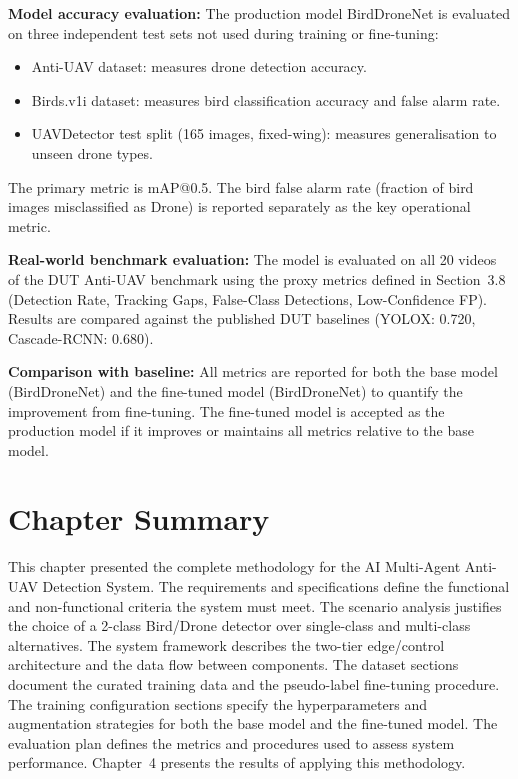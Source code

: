 \documentclass[12pt,a4paper]{report}
\begin{document}
\textbf{Model accuracy evaluation:}
The production model BirdDroneNet is evaluated on three independent
test sets not used during training or fine-tuning:
\begin{itemize}
  \item Anti-UAV dataset: measures drone detection accuracy.
  \item Birds.v1i dataset: measures bird classification
        accuracy and false alarm rate.
  \item UAVDetector test split (165 images, fixed-wing): measures
        generalisation to unseen drone types.
\end{itemize}
The primary metric is mAP@0.5. The bird false alarm rate (fraction of bird
images misclassified as Drone) is reported separately as the key operational
metric.

\textbf{Real-world benchmark evaluation:}
The model is evaluated on all 20 videos of the DUT Anti-UAV benchmark
using the proxy metrics defined in Section~3.8 (Detection Rate, Tracking
Gaps, False-Class Detections, Low-Confidence FP). Results are compared
against the published DUT baselines (YOLOX: 0.720, Cascade-RCNN: 0.680).

\textbf{Comparison with baseline:}
All metrics are reported for both the base model (BirdDroneNet) and the
fine-tuned model (BirdDroneNet) to quantify the improvement from
fine-tuning. The fine-tuned model is accepted as the production model
if it improves or maintains all metrics relative to the base model.

\section{Chapter Summary}

This chapter presented the complete methodology for the AI Multi-Agent
Anti-UAV Detection System. The requirements and specifications define
the functional and non-functional criteria the system must meet. The
scenario analysis justifies the choice of a 2-class Bird/Drone detector
over single-class and multi-class alternatives. The system framework
describes the two-tier edge/control architecture and the data flow
between components. The dataset sections document the curated training
data and the pseudo-label fine-tuning procedure. The training configuration
sections specify the hyperparameters and augmentation strategies for both
the base model and the fine-tuned model. The evaluation plan defines the
metrics and procedures used to assess system performance. Chapter~4
presents the results of applying this methodology.
\end{document}
